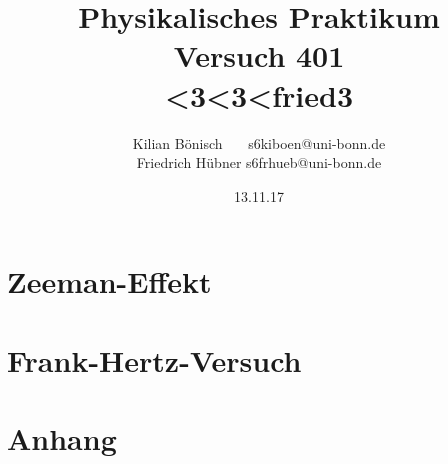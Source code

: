 \documentclass{article}
\newcommand{\RM}[1]{\MakeUppercase{\romannumeral #1}}
\begin{document}
\setlength{\parindent}{0em}   %
\title{Physikalisches Praktikum \RM{4}\\Versuch 401\\<3<3<fried3}
\author{Kilian Bönisch \ \ \ \qquad s6kiboen@uni-bonn.de \\
  Friedrich Hübner \qquad s6frhueb@uni-bonn.de }
\date{13.11.17}

\maketitle

\newpage

\thispagestyle{empty}

\tableofcontents

\newpage



\section{Zeeman-Effekt}




\section{Frank-Hertz-Versuch}







\section{Anhang}
%

\FloatBarrier
\printbibliography

\newpage
\end{document}
